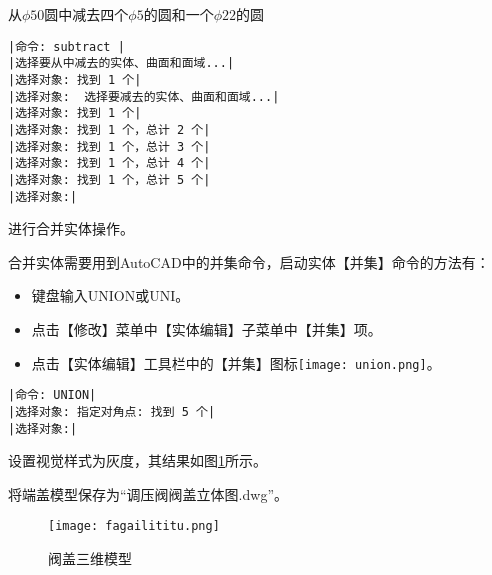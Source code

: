 \begin{procedure}
从$\phi 50$圆中减去四个$\phi 5$的圆和一个$\phi 22$的圆
\begin{lstlisting}
|命令: subtract |
|选择要从中减去的实体、曲面和面域...|
|选择对象: 找到 1 个|
|选择对象:  选择要减去的实体、曲面和面域...|
|选择对象: 找到 1 个|
|选择对象: 找到 1 个，总计 2 个|
|选择对象: 找到 1 个，总计 3 个|
|选择对象: 找到 1 个，总计 4 个|
|选择对象: 找到 1 个，总计 5 个|
|选择对象:|
\end{lstlisting}
\item 进行合并实体操作。

合并实体需要用到AutoCAD中的并集命令，启动实体【并集】命令的方法有：
\begin{itemize}
\item 键盘输入UNION或UNI。
\item 点击【修改】菜单中【实体编辑】子菜单中【并集】项。
\item 点击【实体编辑】工具栏中的【并集】图标\texttt{[image: union.png]}。
\end{itemize}
\begin{lstlisting}
|命令: UNION|
|选择对象: 指定对角点: 找到 5 个|
|选择对象:|
\end{lstlisting}
\item 设置视觉样式为灰度，其结果如图\ref{fig:fagailititu}所示。
\item 将端盖模型保存为“调压阀阀盖立体图.dwg”。
\end{procedure}
\begin{figure}[htbp]
\texttt{[image: fagailititu.png]}
\caption{阀盖三维模型}\label{fig:fagailititu}
\end{figure}
\endinput
